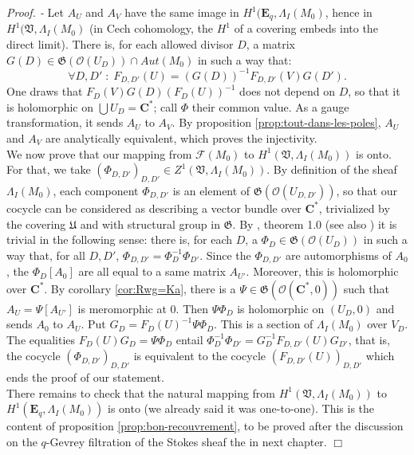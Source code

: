 \documentclass[english]{smfart}
\numberwithin{equation}{thm}
\def \Pr {\textsl{Proof. - }}
\def\C{{\mathbf C}}
\def\F{{\mathcal{F}}}
\def\O{{\mathcal{O}}}
\def\Eq{{\mathbf{E}_{q}}}
\def\G{{\mathfrak{G}}}
\def\U{{\mathfrak{U}}}
\def\V{{\mathfrak{V}}}
\def\Rwg{{\mathcal{O}(\C^{*},0)}}
\def\l{\left}
\def\r{\right}
\def\La{\Lambda}
\begin{document}
\Pr
Let $A_{U}$ and $A_{V}$ have the same image in
$H^{1}(\Eq,\La_{I}(M_{0})$, hence in $H^{1}(\V,\La_{I}(M_{0})$
(in Cech cohomology, the $H^{1}$ of a covering embeds into the
direct limit). There is, for each allowed divisor $D$, a matrix
$G(D) \in \G(\O(U_{D})) \cap Aut(M_{0})$ in such a way that:
$$
\forall D,D' \;:\;
F_{D,D'}(U) = \l(G(D)\r)^{-1} F_{D,D'}(V) G(D').
$$
One draws that $F_{D}(V) G(D) \l(F_{D}(U)\r)^{-1}$ does not depend
on $D$, so that it is holomorphic on $\bigcup U_{D} = \C^{*}$; call
$\Phi$ their common value. As a gauge transformation, it sends $A_{U}$
to $A_{V}$. By proposition \ref{prop:tout-dans-les-poles}, $A_{U}$
and $A_{V}$ are analytically equivalent, which proves the injectivity. \\

We now prove that our mapping from $\F(M_{0})$ to 
$H^{1}(\V,\La_{I}(M_{0}))$ is onto. For that, we 
take $(\Phi_{D,D'})_{D,D'} \in Z^{1}(\V,\La_{I}(M_{0}))$.
By definition of the sheaf $\La_{I}(M_{0})$, each component
$\Phi_{D,D'}$ is an element of $\G(\O(U_{D,D'}))$, so that
our cocycle can be considered as describing a vector bundle
over $\C^{*}$, trivialized by the covering $\U$ and with
structural group in $\G$. By \cite{Rohrl62}, theorem 1.0
(see also \cite{Rohrl57}) it is trivial in the following 
sense: there is, for each $D$, a $\Phi_{D} \in \G(\O(U_{D}))$
in such a way that, for all $D,D'$, 
$\Phi_{D,D'} = \Phi_{D}^{-1} \Phi_{D'}$. 
Since the $\Phi_{D,D'}$ are automorphisms of $A_{0}$,
the $\Phi_{D}[A_{0}]$ are all equal to a same matrix
$A_{U'}$. Moreover, this is holomorphic over $\C^{*}$.
By corollary \ref{cor:Rwg=Ka}, there is a 
$\Psi \in \G(\Rwg)$ such that $A_{U} = \Psi[A_{U'}]$
is meromorphic at $0$. Then $\Psi \Phi_{D}$ is holomorphic
on $(U_{D},0)$ and sends $A_{0}$ to $A_{U}$. Put
$G_{D} = F_{D}(U)^{-1} \Psi \Phi_{D}$. This is a section
of $\La_{I}(M_{0})$ over $V_{D}$. The equalities
$F_{D}(U) G_{D} = \Psi \Phi_{D}$ entail
$\Phi_{D}^{-1} \Phi_{D'} = G_{D}^{-1} F_{D,D'}(U) G_{D'}$,
that is, the cocycle $(\Phi_{D,D'})_{D,D'}$ is equivalent
to the cocycle $(F_{D,D'}(U))_{D,D'}$ which ends the proof
of our statement. \\

There remains to check that the natural mapping from
$H^{1}(\V,\La_{I}(M_{0}))$ to $H^{1}(\Eq,\La_{I}(M_{0}))$
is onto (we already said it was one-to-one). This is the 
content of proposition \ref{prop:bon-recouvrement}, to
be proved after the discussion on the $q$-Gevrey filtration 
of the Stokes sheaf the in next chapter.
\hfill $\Box$
\end{document}
